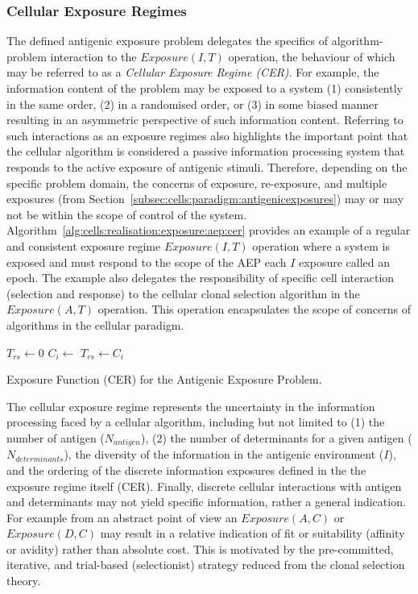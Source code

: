 \subsubsection{Cellular Exposure Regimes}
The defined antigenic exposure problem delegates the specifics of algorithm-problem interaction to the $Exposure(I,T)$ operation, the behaviour of which may be referred to as a \emph{Cellular Exposure Regime (CER)}. For example, the information content of the problem may be exposed to a system (1) consistently in the same order, (2) in a randomised order, or (3) in some biased manner resulting in an asymmetric perspective of such information content. Referring to such interactions as an exposure regimes also highlights the important point that the cellular algorithm is considered a passive information processing system that responds to the active exposure of antigenic stimuli. Therefore, depending on the specific problem domain, the concerns of exposure, re-exposure, and multiple exposures (from Section~\ref{subsec:cells:paradigm:antigenicexposures}) may or may not be within the scope of control of the system. Algorithm~\ref{alg:cells:realisation:exposure:aep:cer} provides an example of a regular and consistent exposure regime $Exposure(I,T)$ operation where a system is exposed and must respond to the scope of the AEP each $I$ exposure called an epoch. The example also delegates the responsibility of specific cell interaction (selection and response) to the cellular clonal selection algorithm in the $Exposure(A,T)$ operation. This operation encapsulates the scope of concerns of algorithms in the cellular paradigm.

\begin{algorithm}[ht]	
	\SetLine
	
	\KwIn{\Infection, \Tissue}
	
  $T_{rs} \leftarrow$0\;
	{		
		$C_{i} \leftarrow$ \;
		$T_{rs} \leftarrow C_{i}$\;
	} 
	\;
	
	\caption{Exposure Function (CER) for the Antigenic Exposure Problem.}
	\label{alg:cells:realisation:exposure:aep:cer}
\end{algorithm}


The cellular exposure regime represents the uncertainty in the information processing faced by a cellular algorithm, including but not limited to (1) the number of antigen ($N_{antigen}$), (2) the number of determinants for a given antigen ($N_{determinants}$), the diversity of the information in the antigenic environment ($I$), and the ordering of the discrete information exposures defined in the the exposure regime itself (CER). Finally, discrete cellular interactions with antigen and determinants may not yield specific information, rather a general indication. For example from an abstract point of view an $Exposure(A, C)$ or $Exposure(D, C)$ may result in a relative indication of fit or suitability (affinity or avidity) rather than absolute cost. This is motivated by the pre-committed, iterative, and trial-based (selectionist) strategy reduced from the clonal selection theory.


